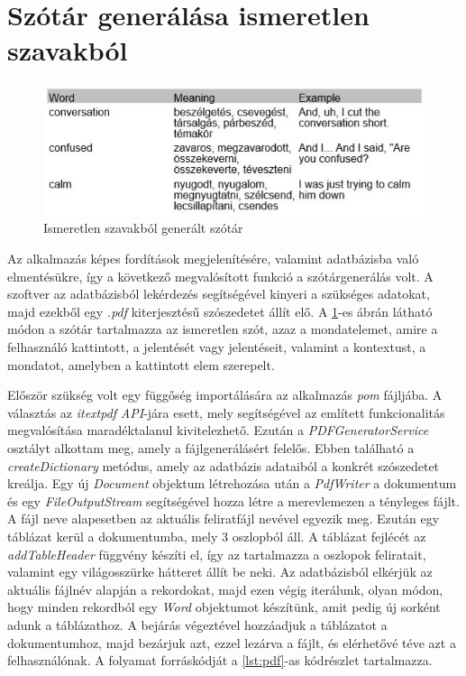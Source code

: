 \section{Szótár generálása ismeretlen szavakból}

\begin{figure}[h!]
  \includegraphics[width=\linewidth]{images/pdf.jpg}
  \caption{Ismeretlen szavakból generált szótár}
  \label{fig:pdf}
\end{figure}

Az alkalmazás képes fordítások megjelenítésére, valamint adatbázisba való elmentésükre, így a következő megvalósított funkció a szótárgenerálás volt. A szoftver az adatbázisból lekérdezés segítségével kinyeri a szükséges adatokat, majd ezekből egy \textit{.pdf} kiterjesztésű szószedetet állít elő. A \ref{fig:pdf}-es ábrán látható módon a szótár tartalmazza az ismeretlen szót, azaz a mondatelemet, amire a felhasználó kattintott, a jelentését vagy jelentéseit, valamint a kontextust, a mondatot, amelyben a kattintott elem szerepelt.

Először szükség volt egy függőség importálására az alkalmazás \textit{pom} fájljába. A választás az \textit{itextpdf} \textit{API}-jára esett, mely segítségével az említett funkcionalitás megvalósítása maradéktalanul kivitelezhető. Ezután a \textit{PDFGeneratorService} osztályt alkottam meg, amely a fájlgenerálásért felelős. Ebben található a \textit{createDictionary} metódus, amely az adatbázis adataiból a konkrét szószedetet kreálja. Egy új \textit{Document} objektum létrehozása után a \textit{PdfWriter} a dokumentum és egy \textit{FileOutputStream} segítségével hozza létre a merevlemezen a tényleges fájlt. A fájl neve alapesetben az aktuális feliratfájl nevével egyezik meg. Ezután egy táblázat kerül a dokumentumba, mely 3 oszlopból áll. A táblázat fejlécét az \textit{addTableHeader} függvény készíti el, így az tartalmazza a oszlopok feliratait, valamint egy világosszürke hátteret állít be neki. Az adatbázisból elkérjük az aktuális fájlnév alapján a rekordokat, majd ezen végig iterálunk, olyan módon, hogy minden rekordból egy \textit{Word} objektumot készítünk, amit pedig új sorként adunk a táblázathoz. A bejárás végeztével hozzáadjuk a táblázatot a dokumentumhoz, majd bezárjuk azt, ezzel lezárva a fájlt, és elérhetővé téve azt a felhasználónak. A folyamat forráskódját a \ref{lst:pdf}-as kódrészlet tartalmazza.

